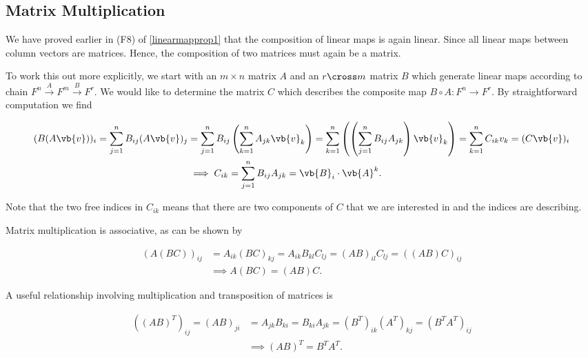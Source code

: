\documentclass[a4paper,12pt]{report}
\begin{document}
\subsection{Matrix Multiplication}

We have proved earlier in (F8) of \cref{linearmapprop1} that the composition of linear maps is again linear. Since all linear maps between column vectors are matrices. Hence, the composition of two matrices must again be a matrix. 

To work this out more explicitly, we start with an \(m \times n\) matrix \(A\) and an \(r \cross m\) matrix \(B\) which generate linear maps according to chain \(F^{n} \stackrel{A}{\rightarrow } F^{m} \stackrel{B}{\rightarrow } F^{r}   \). We would like to determine the matrix \(C\) which describes the composite map \(B \circ A: F^{n} \rightarrow F^{r}  \). By straightforward computation we find

\begin{equation}
    \begin{aligned}
    (B(A\vb{v} ))_{i} = \sum_{j=1}^{n} B_{ij} (A\vb{v} )_{j} &= \sum_{j=1}^{n} B_{ij} \left( \sum_{k=1}^{n} A_{jk}\vb{v} _{k}\right) = \sum_{k=1}^{n} \left( \left(\sum_{j=1}^{n} B_{ij} A_{jk}  \right) \vb{v} _{k} \right)= \sum_{k=1}^{n} C_{ik} v_{k} = (C\vb{v} )_{i} \\
    &\implies C_{ik} = \sum_{j=1}^{n} B_{ij} A_{jk} = \vb{B} _{i} \cdot \vb{A} ^{k}.   
    \end{aligned}
\end{equation}

Note that the two free indices in \(C_{ik} \) means that there are two components of \(C\) that we are interested in and the indices are describing. 

Matrix multiplication is associative, as can be shown by 

\begin{equation}
    \begin{aligned}
    (A(BC))_{ij} &= A_{ik}(BC)_{kj} = A_{ik}B_{kl}C_{lj} = (AB)_{il}C_{lj} = ((AB)C)_{ij} \\
    &\implies A(BC) = (AB)C.
    \end{aligned}
\end{equation}

A useful relationship involving multiplication and transposition of matrices is 

\begin{equation}
    \begin{aligned}
    ((AB)^{T} )_{ij} = (AB)_{ji} &= A _{jk}B_{ki} = B_{ki}A_{jk} = (B^{T} )_{ik} (A^{T} )_{kj} = (B^{T}A^{T}  )_{ij} \\
    &\implies (AB)^{T} = B^{T} A^{T}.   
    \end{aligned}     
\end{equation}
\end{document}
